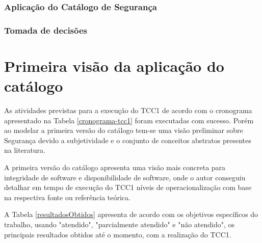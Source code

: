 \subsubsection{Aplicação do Catálogo de Segurança}

\subsubsection{Tomada de decisões}


\section{Primeira visão da aplicação do catálogo}
\label{sec: aplicacaoDoCatalogo}
As atividades previstas para a execução do TCC1 de acordo com o cronograma apresentado na Tabela \ref{cronograma-tcc1} foram executadas com sucesso. Porém ao modelar a primeira versão do catálogo tem-se uma visão preliminar sobre Segurança devido a subjetividade e o conjunto de conceitos abstratos presentes na literatura.

A primeira versão do catálogo apresenta uma visão mais concreta para integridade de software e disponibilidade de software, onde o autor conseguiu detalhar em tempo de execução do TCC1 níveis de operacionalização com base na respectiva fonte ou referência teórica.

A Tabela \ref{resultadosObtidos} apresenta de acordo com os objetivos específicos do trabalho, usando "atendido", "parcialmente atendido" e "não atendido", os principais resultados obtidos até o momento, com a realização do TCC1.

